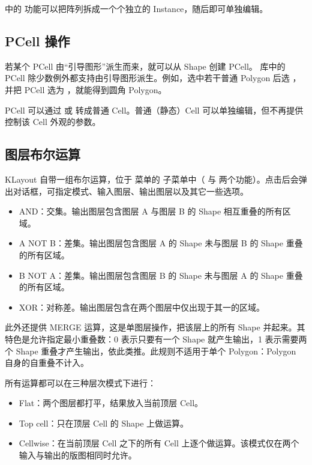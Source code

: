  中的  功能可以把阵列拆成一个个独立的 Instance，随后即可单独编辑。

\subsection{PCell 操作}\label{sec:pcell_operations}

若某个 PCell 由“引导图形”派生而来，就可以从 Shape 创建 PCell。 库中的 PCell 除少数例外都支持由引导图形派生。例如，选中若干普通 Polygon 后选 ，并把 PCell 选为 ，就能得到圆角 Polygon。

PCell 可以通过  或  转成普通 Cell。普通（静态）Cell 可以单独编辑，但不再提供控制该 Cell 外观的参数。

\subsection{图层布尔运算}\label{sec:layer_boolean}

KLayout 自带一组布尔运算，位于  菜单的  子菜单中（ 与  两个功能）。点击后会弹出对话框，可指定模式、输入图层、输出图层以及其它一些选项。

\begin{itemize}
\item AND：交集。输出图层包含图层 A 与图层 B 的 Shape 相互重叠的所有区域。
\item A NOT B：差集。输出图层包含图层 A 的 Shape 未与图层 B 的 Shape 重叠的所有区域。
\item B NOT A：差集。输出图层包含图层 B 的 Shape 未与图层 A 的 Shape 重叠的所有区域。
\item XOR：对称差。输出图层包含在两个图层中仅出现于其一的区域。
\end{itemize}

此外还提供 MERGE 运算，这是单图层操作，把该层上的所有 Shape 并起来。其特色是允许指定最小重叠数：0 表示只要有一个 Shape 就产生输出，1 表示需要两个 Shape 重叠才产生输出，依此类推。此规则不适用于单个 Polygon：Polygon 自身的自重叠不计入。

所有运算都可以在三种层次模式下进行：

\begin{itemize}
\item Flat：两个图层都打平，结果放入当前顶层 Cell。
\item Top cell：只在顶层 Cell 的 Shape 上做运算。
\item Cellwise：在当前顶层 Cell 之下的所有 Cell 上逐个做运算。该模式仅在两个输入与输出的版图相同时允许。
\end{itemize}

